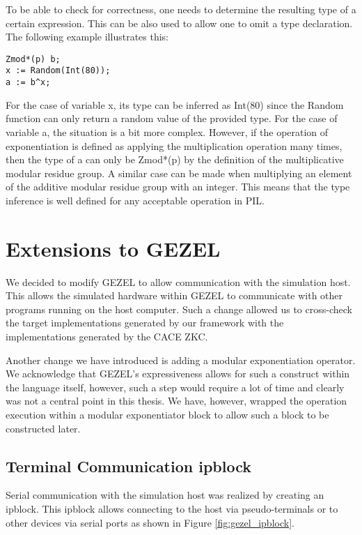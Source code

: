 To be able to check for correctness, one needs to determine the resulting
type of a certain expression. This can be also used to allow one to omit
a type declaration. The following example illustrates this:
\begin{lstlisting}[language=PIL]
Zmod*(p) b;
x := Random(Int(80));
a := b^x;
\end{lstlisting}
For the case of variable x, its type can be inferred as Int(80) since
the Random function can only return a random value of the provided
type. For the case of variable a, the situation is a bit more
complex. However, if the operation of exponentiation is defined as
applying the multiplication operation many times, then the type of a
can only be Zmod*(p) by the definition of the multiplicative modular
residue group. A similar case can be made when multiplying an element
of the additive modular residue group with an integer. This means that
the type inference is well defined for any acceptable operation in
PIL.

\section{Extensions to GEZEL}
\label{sec:gezel_extensions}

We decided to modify GEZEL to allow communication with the simulation
host. This allows the simulated hardware within GEZEL to communicate
with other programs running on the host computer. Such a change
allowed us to cross-check the target implementations generated by our
framework with the implementations generated by the CACE ZKC.

Another change we have introduced is adding a modular exponentiation
operator. We acknowledge that GEZEL's expressiveness allows for such a
construct within the language itself, however, such a step would
require a lot of time and clearly was not a central point in this
thesis. We have, however, wrapped the operation execution within a
modular exponentiator block to allow such a block to be constructed
later.

\subsection{Terminal Communication ipblock}

Serial communication with the simulation host was realized by creating
an ipblock. This ipblock allows connecting to the host via
pseudo-terminals or to other devices via serial ports as shown in
Figure \ref{fig:gezel_ipblock}.

